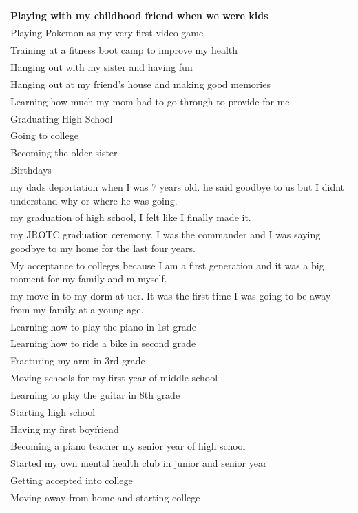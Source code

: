 \documentclass[
  .7em,
  letterpaper,
  DIV=11,
  numbers=noendperiod]{scrartcl}
\begin{document}
\begin{table}
\begin{tabular}{l}
\hline
Playing with my childhood friend when we were kids\\
\hline
Playing Pokemon as my very first video game\\
\hline
Training at a fitness boot camp to improve my health\\
\hline
Hanging out with my sister and having fun\\
\hline
Hanging out at my friend's house and making good memories\\
\hline
Learning how much my mom had to go through to provide for me\\
\hline
Graduating High School\\
\hline
Going to college\\
\hline
Becoming the older sister\\
\hline
Birthdays\\
\hline
my dads deportation when I was 7 years old. he said goodbye to us but I didnt understand why or where he was going.\\
\hline
my graduation of high school, I felt like I finally made it.\\
\hline
my JROTC graduation ceremony. I was the commander and I was saying goodbye to my home for the last four years.\\
\hline
My acceptance to colleges because I am a first generation and it was a big moment for my family and m myself.\\
\hline
my move in to my dorm at ucr. It was the first time I was going to be away from my family at a young age.\\
\hline
Learning how to play the piano in 1st grade\\
\hline
Learning how to ride a bike in second grade\\
\hline
Fracturing my arm in 3rd grade\\
\hline
Moving schools for my first year of middle school\\
\hline
Learning to play the guitar in 8th grade\\
\hline
Starting high school\\
\hline
Having my first boyfriend\\
\hline
Becoming a piano teacher my senior year of high school\\
\hline
Started my own mental health club in junior and senior year\\
\hline
Getting accepted into college\\
\hline
Moving away from home and starting college\\

\end{tabular}
\end{table}
\end{document}
